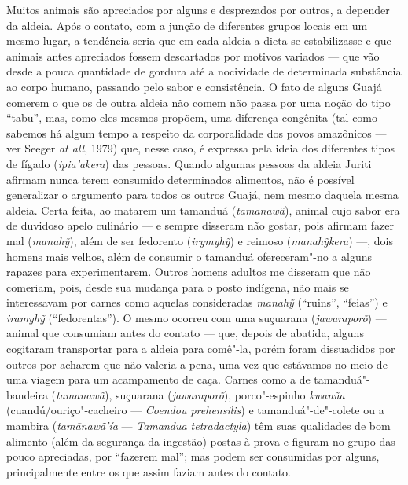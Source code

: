 Muitos animais são apreciados por alguns e desprezados por outros, a
depender da aldeia. Após o contato, com a junção de diferentes grupos
locais em um mesmo lugar, a tendência seria que em cada aldeia a dieta
se estabilizasse e que animais antes apreciados fossem descartados por
motivos variados --- que vão desde a pouca quantidade de gordura até a
nocividade de determinada substância ao corpo humano, passando pelo
sabor e consistência. O fato de alguns Guajá comerem o que os de outra
aldeia não comem não passa por uma noção do tipo ``tabu'', mas, como eles
mesmos propõem, uma diferença congênita (tal como sabemos há algum tempo
a respeito da corporalidade dos povos amazônicos --- ver Seeger \emph{at
all}, 1979) que, nesse caso, é expressa pela ideia dos diferentes tipos
de fígado (\emph{ipia'akera}) das pessoas. Quando algumas pessoas da
aldeia Juriti afirmam nunca terem consumido determinados alimentos, não
é possível generalizar o argumento para todos os outros Guajá, nem mesmo
daquela mesma aldeia. Certa feita, ao matarem um tamanduá
(\emph{tamanawã}), animal cujo sabor era de duvidoso apelo culinário --- e
sempre disseram não gostar, pois afirmam fazer mal (\emph{manahỹ}), além
de ser fedorento (\emph{irymyhỹ}) e reimoso (\emph{manahỹkera}) ---, dois
homens mais velhos, além de consumir o tamanduá ofereceram"-no a alguns
rapazes para experimentarem. Outros homens adultos me disseram que não
comeriam, pois, desde sua mudança para o posto indígena, não mais se
interessavam por carnes como aquelas consideradas \emph{manahỹ}
(``ruins'', ``feias'') e \emph{iramyhỹ} (``fedorentas''). O mesmo ocorreu com
uma suçuarana (\emph{jawaraporõ}) --- animal que consumiam antes do
contato --- que, depois de abatida, alguns cogitaram transportar para a
aldeia para comê"-la, porém foram dissuadidos por outros por acharem que
não valeria a pena, uma vez que estávamos no meio de uma viagem para um
acampamento de caça. Carnes como a de tamanduá"-bandeira
(\emph{tamanawã}), suçuarana (\emph{jawaraporõ}), porco"-espinho
\emph{kwanũa} (cuandú/ouriço"-cacheiro --- \emph{Coendou prehensilis}) e
tamanduá"-de"-colete ou a mambira (\emph{tamãnawã'ía} --- \emph{Tamandua
tetradactyla}) têm suas qualidades de bom alimento (além da segurança da
ingestão) postas à prova e figuram no grupo das pouco apreciadas, por
``fazerem mal''; mas podem ser consumidas por alguns, principalmente
entre os que assim faziam antes do contato.

